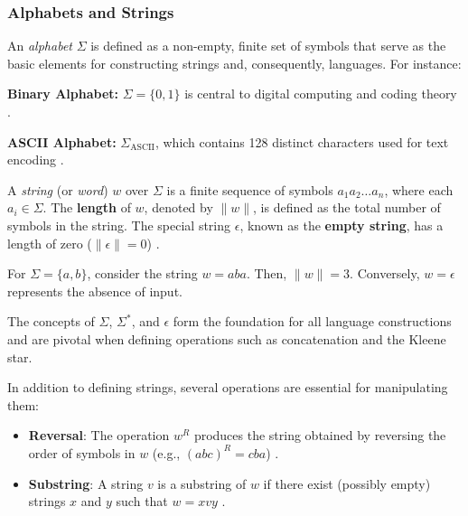 \subsubsection{Alphabets and Strings}
An \textit{alphabet} $\Sigma$ is defined as a non-empty, finite set of symbols that serve as the basic elements for constructing strings and, consequently, languages. For instance:

\begin{example}
\textbf{Binary Alphabet:} $\Sigma = \{0, 1\}$ is central to digital computing and coding theory \cite{sipser2013introduction}.
\end{example}

\begin{example}
\textbf{ASCII Alphabet:} $\Sigma_{\text{ASCII}}$, which contains 128 distinct characters used for text encoding \cite{cady1986ascii}.
\end{example}

A \textit{string} (or \textit{word}) $w$ over $\Sigma$ is a finite sequence of symbols $a_1a_2\ldots a_n$, where each $a_i \in \Sigma$. The \textbf{length} of $w$, denoted by $\|w\|$, is defined as the total number of symbols in the string. The special string $\epsilon$, known as the \textbf{empty string}, has a length of zero ($\|\epsilon\| = 0$) \cite{sipser2013introduction}.

\begin{example}
For $\Sigma = \{a, b\}$, consider the string $w = aba$. Then, $\|w\| = 3$. Conversely, $w = \epsilon$ represents the absence of input.
\end{example}

\begin{remark}
The concepts of $\Sigma$, $\Sigma^\ast$, and $\epsilon$ form the foundation for all language constructions and are pivotal when defining operations such as concatenation and the Kleene star.
\end{remark}

In addition to defining strings, several operations are essential for manipulating them:
\begin{itemize}
    \item \textbf{Reversal}: The operation $w^R$ produces the string obtained by reversing the order of symbols in $w$ (e.g., $(abc)^R = cba$) \cite{sipser2013introduction}.
    \item \textbf{Substring}: A string $v$ is a substring of $w$ if there exist (possibly empty) strings $x$ and $y$ such that $w = xvy$ \cite{sipser2013introduction}.
\end{itemize}


